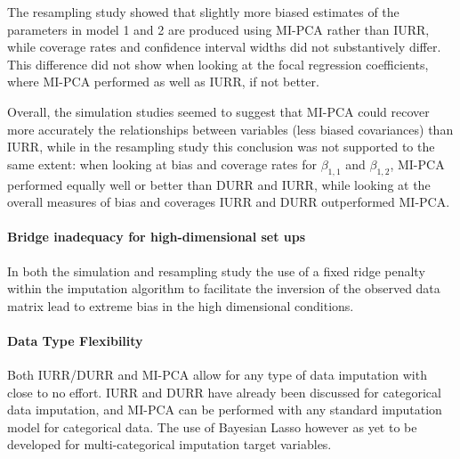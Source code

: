 	The resampling study showed that slightly more biased estimates of the parameters in model 1 and 2 are produced 
	using MI-PCA rather than IURR, while coverage rates and confidence interval widths did not substantively differ.
	This difference did not show when looking at the focal regression coefficients, where MI-PCA performed as well 
	as IURR, if not better.
	
	Overall, the simulation studies seemed to suggest that MI-PCA could recover more accurately the relationships
	between variables (less biased covariances) than IURR, while in the resampling study this conclusion was not
	supported to the same extent: when looking at bias and coverage rates for $\beta_{1,1}$ and $\beta_{1,2}$, MI-PCA 
	performed equally well or better than DURR and IURR, while looking at the overall measures of bias and coverages
	IURR and DURR outperformed MI-PCA.

\paragraph{Bridge inadequacy for high-dimensional set ups}
	In both the simulation and resampling study the use of a fixed ridge penalty within the imputation
	algorithm to facilitate the inversion of the observed data matrix lead to extreme bias in the high
	dimensional conditions.

\paragraph{Data Type Flexibility}
	Both IURR/DURR and MI-PCA allow for any type of data imputation with close to no effort.
	IURR and DURR have already been discussed for categorical data imputation, and MI-PCA can be performed
	with any standard imputation model for categorical data.
	The use of Bayesian Lasso however as yet to be developed for multi-categorical imputation target 
	variables.

